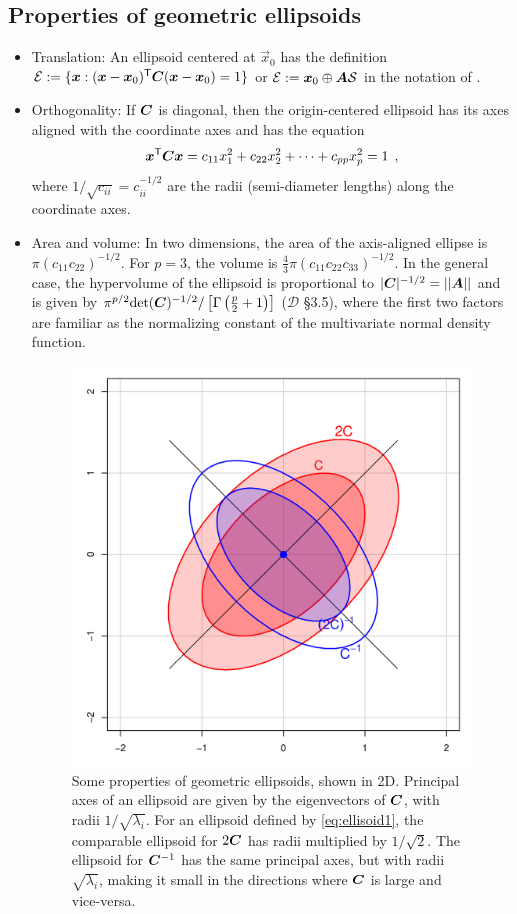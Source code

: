 \subsection{Properties of geometric ellipsoids}\label{sec:properties}

\begin{itemize}
 \item Translation: An ellipsoid centered at $\vec{x}_0$ has the definition $\mathcal{E} := \{ \bm{x}: (\bm{x}-\bm{x}_0)^\mathsf{T} \bm{C} (\bm{x}-\bm{x}_0) =1
 \}$ or $\mathcal{E} := \bm{x}_0 \oplus\bm{A} \mathcal{S}$ in the notation of .

 \item Orthogonality: If $\bm{C}$ is diagonal, then the origin-centered ellipsoid has its axes aligned with the coordinate axes and
has the equation
\begin{equation}\label{eq:ellisoid2}
 \bm{x}^\mathsf{T} \bm{C} \bm{x} = c_{11} x_1^2 + c_{22} x_2^2 + \cdots + c_{pp} x_p^2 =1 \:\: ,
\end{equation}
where $1/\sqrt{c_{ii}} = c_{ii}^{-1/2}$ are the radii (semi-diameter lengths) along the coordinate axes.

 \item Area and volume: In two dimensions, the area of the axis-aligned ellipse is $\pi (c_{11} c_{22})^{-1/2}$.
 For $p=3$, the volume is $\frac{4}{3}\pi (c_{11} c_{22} c_{33})^{-1/2}$.
 In the general case, the hypervolume of the ellipsoid is proportional to $|\bm{C}|^{-1/2}=||\bm{A}||$
 and is given by $\pi^{p/2} \mathrm{det} (\bm{C})^{-1/2} / \left[  \Gamma\left(\frac{p}{2}+1\right) \right]$
 ($\mathcal{D}$ \S 3.5),
 where the first two factors are familiar as the normalizing constant of the multivariate normal 
 density function.

\begin{figure}[tb]
  \centering
  \includegraphics[width=.5\textwidth,clip]{fig/inverse}
  \caption{Some properties of geometric ellipsoids, shown in 2D. Principal axes of an ellipsoid are given by the eigenvectors of
  $\bm{C}$, with radii $1/\sqrt{\lambda_i}$.  For an ellipsoid defined by \eqref{eq:ellisoid1},
  the comparable ellipsoid for $2\bm{C}$ has radii multiplied by $1/\sqrt{2}$.
  The ellipsoid for $\bm{C}^{-1}$ has the same principal axes, but with radii $\sqrt{\lambda_i}$, making it
  small in the directions where $\bm{C}$ is large and vice-versa.
  } \label{fig:inverse}
\end{figure}


\end{itemize}
